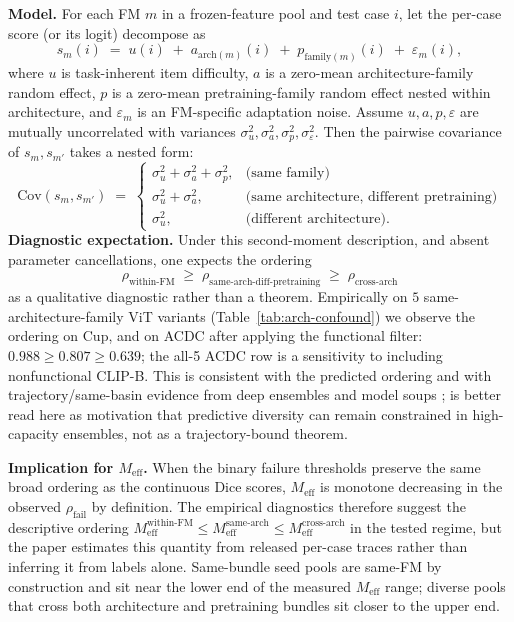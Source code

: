 \textbf{Model.} For each FM $m$ in a frozen-feature pool and test case $i$, let
the per-case score (or its logit) decompose as
\[
  s_m(i) \;=\; u(i) \;+\; a_{\mathrm{arch}(m)}(i) \;+\; p_{\mathrm{family}(m)}(i) \;+\; \varepsilon_m(i),
\]
where $u$ is task-inherent item difficulty, $a$ is a zero-mean architecture-family
random effect, $p$ is a zero-mean pretraining-family random effect nested within
architecture, and $\varepsilon_m$ is an FM-specific adaptation noise. Assume
$u, a, p, \varepsilon$ are mutually uncorrelated with variances
$\sigma^2_u, \sigma^2_a, \sigma^2_p, \sigma^2_\varepsilon$. Then the pairwise
covariance of $s_m, s_{m'}$ takes a nested form:
\[
  \mathrm{Cov}(s_m, s_{m'}) \;=\; 
  \begin{cases}
    \sigma^2_u + \sigma^2_a + \sigma^2_p, & \text{(same family)}\\[2pt]
    \sigma^2_u + \sigma^2_a,              & \text{(same architecture, different pretraining)}\\[2pt]
    \sigma^2_u,                           & \text{(different architecture)}.
  \end{cases}
\]
\textbf{Diagnostic expectation.} Under this second-moment description, and
absent parameter cancellations, one expects the ordering
\[
  \rho_{\text{within-FM}} \;\geq\; \rho_{\text{same-arch-diff-pretraining}} \;\geq\; \rho_{\text{cross-arch}}
\]
as a qualitative diagnostic rather than a theorem. Empirically on $5$ same-architecture-family ViT variants
(Table~\ref{tab:arch-confound}) we observe the ordering on Cup, and on ACDC after applying the functional filter:
$0.988 \geq 0.807 \geq 0.639$; the all-5 ACDC row is a sensitivity to including nonfunctional CLIP-B.
This is consistent with the predicted ordering and with trajectory/same-basin evidence from deep ensembles and model soups
\citep{fort2019loss,neyshabur2020what,wortsman2022soups}; \citet{abe2023pathologies} is better read here as motivation that predictive diversity can remain constrained in high-capacity ensembles, not as a trajectory-bound theorem.

\textbf{Implication for $M_{\mathrm{eff}}$.} When the binary failure thresholds
preserve the same broad ordering as the continuous Dice scores, $M_{\mathrm{eff}}$
is monotone decreasing in the observed $\rho_{\mathrm{fail}}$ by definition. The
empirical diagnostics therefore suggest the descriptive ordering
$M_{\mathrm{eff}}^{\text{within-FM}} \leq M_{\mathrm{eff}}^{\text{same-arch}} \leq M_{\mathrm{eff}}^{\text{cross-arch}}$
in the tested regime, but the paper estimates this quantity from released
per-case traces rather than inferring it from labels alone. Same-bundle seed pools
are same-FM by construction and sit near the lower end of the measured
$M_{\mathrm{eff}}$ range; diverse pools that cross both architecture and
pretraining bundles sit closer to the upper end.

